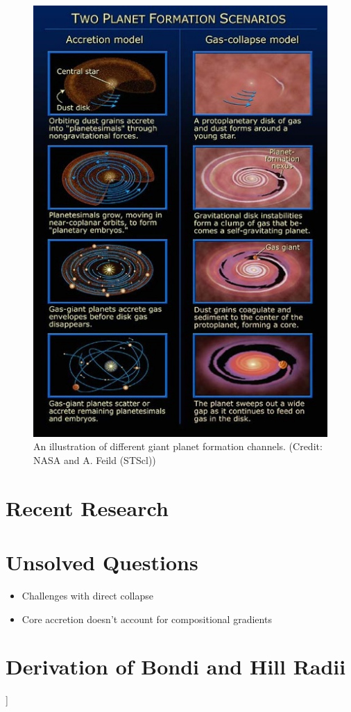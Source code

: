 \documentclass[twocolumn]{aastex631}
\newcommand{\todo}[1]{{\color{red}{[TODO: #1}]}}
\begin{document}
\begin{figure}
    \centering
    \includegraphics[width=\columnwidth]{channels_illustration.jpg}
    \caption{An illustration of different giant planet formation channels. (Credit: NASA and A. Feild (STScl))}
    \label{fig:formation_diagram}
\end{figure}

\section{Recent Research}

\section{Unsolved Questions}

\begin{itemize}
    \item Challenges with direct collapse \citep{Forgan+2013}
    \item Core accretion doesn't account for compositional gradients \citep{D'Angelo+2018}
\end{itemize}


{}

\appendix

\section{Derivation of Bondi and Hill Radii}\label{app:maths}

\todo{}
\end{document}
